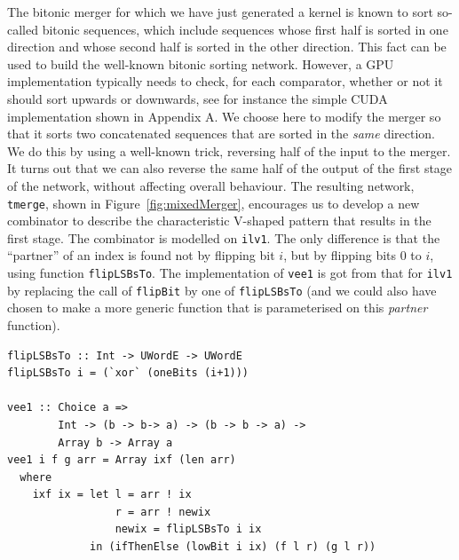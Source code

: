 \documentclass[]{sigplanconf}
\begin{document}
The bitonic merger for which we have just generated a kernel is known
to sort so-called bitonic sequences, which include sequences whose first
half is sorted in one direction and whose second half is sorted in the other
direction. This fact can be used to build the well-known bitonic sorting
network. However, a GPU implementation typically needs to check, for each comparator,
whether or not it should sort upwards or downwards, see for instance
the simple CUDA implementation shown in Appendix A.
We choose here to modify the merger so that it sorts two concatenated
sequences that are sorted in the {\em same} direction.
We do this by using a well-known trick, reversing half of the input to the merger. It turns out that
we can also reverse the same half of the output of the first stage of
the network, without affecting overall behaviour.
The resulting network, {\tt tmerge}, shown in Figure~\ref{fig:mixedMerger},
encourages us to develop a new combinator to describe the characteristic
V-shaped pattern that results in the first stage.
The combinator is modelled on {\tt ilv1}. The only difference
is that the ``partner'' of an index is found not by flipping bit $i$, but
by flipping bits $0$ to $i$, using function {\tt flipLSBsTo}. The implementation
of {\tt vee1} is got from that for {\tt ilv1} by replacing the call of
{\tt flipBit} by one of {\tt flipLSBsTo} (and we could also have chosen
to make a more generic function that is parameterised on this {\em partner} function).
\begin{codesize}
\begin{verbatim}
flipLSBsTo :: Int -> UWordE -> UWordE
flipLSBsTo i = (`xor` (oneBits (i+1)))

vee1 :: Choice a => 
        Int -> (b -> b-> a) -> (b -> b -> a) -> 
        Array b -> Array a
vee1 i f g arr = Array ixf (len arr)
  where
    ixf ix = let l = arr ! ix
                 r = arr ! newix
                 newix = flipLSBsTo i ix
             in (ifThenElse (lowBit i ix) (f l r) (g l r))
\end{verbatim}
\end{codesize}
\end{document}
